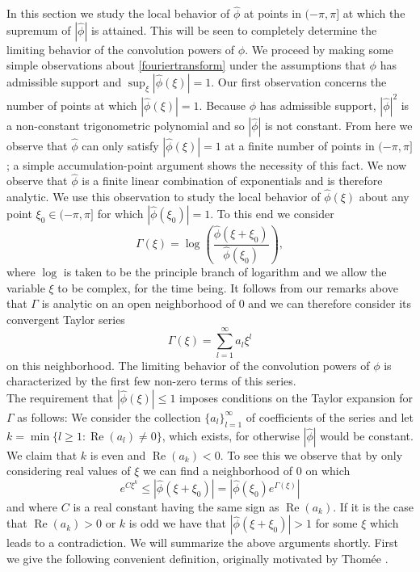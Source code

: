 \documentclass{article}
\theoremstyle{theorem}
\theoremstyle{remark}
\renewcommand\Re{\operatorname{Re}}%
\begin{document}
\noindent In this section we study the local behavior of $\hat{\phi}$ at points in $(-\pi,\pi]$
at which the supremum of $|\hat{\phi}|$ is attained. This will be seen to completely
determine the limiting behavior of the convolution powers of $\phi$. We proceed by making
some simple observations about \eqref{fouriertransform} under the assumptions
that $\phi$ has admissible support and $\sup_{\xi}|\hat{\phi}(\xi)|=1.$ Our first observation concerns the number of points at which $|\hat{\phi}(\xi)|=1.$ Because $\phi$ has admissible support, $|\hat{\phi}|^2$ is a non-constant trigonometric polynomial and so $|\hat{\phi}|$ is not constant. From here we observe that $\hat{\phi}$ can only satisfy $|\hat{\phi}(\xi)|=1$ at a finite number of points in $(-\pi,\pi]$; a simple accumulation-point argument shows the necessity of this fact. We now observe that $\hat{\phi}$ is a finite linear combination of exponentials and is
therefore analytic. We use this observation to study the local behavior of
$\hat{\phi}(\xi)$ about any point $\xi_0\in(-\pi,\pi]$ for which $|\hat{\phi}(\xi_0)|=1$. To
this end we consider 
\begin{equation}
\Gamma(\xi)=\log\left(\frac{\hat{\phi}(\xi+\xi_0)}{\hat{\phi}(\xi_0)}\right),
\end{equation}
where $\log$ is taken to be the principle branch of logarithm and we allow the
variable $\xi$ to be complex, for the time being. It follows from our 
remarks above that $\Gamma$ is analytic on an open neighborhood of $0$ and we can
therefore consider its convergent Taylor series
\begin{equation*}
 \Gamma(\xi)=\sum_{l=1}^\infty a_l \xi^l
\end{equation*} 
on this neighborhood. The limiting behavior of
the convolution powers of $\phi$ is characterized by the
first few non-zero terms of this series.\\

\noindent The requirement that $|\hat{\phi}(\xi)|\leq 1$ imposes conditions on
the Taylor expansion for $\Gamma$ as follows: We consider the collection
$\{a_l\}_{l=1}^{\infty}$ of coefficients of the series and let
$k=\min\{l\geq 1:\Re(a_l)\neq0\}$, which exists, for otherwise $|\hat{\phi}|$ would be
constant. We claim that $k$ is even and $\Re(a_k)<0$. To see this we observe that
by only considering real values of $\xi$ we can find a neighborhood of $0$ on
which
\begin{equation*}
e^{C\xi^k}\leq|\hat{\phi}(\xi+\xi_0)|=|\hat{\phi}(\xi_0)e^{\Gamma(\xi)}|
\end{equation*}
and where $C$ is a real constant having the same sign as $\Re(a_k)$. If it is
the case that $\Re(a_k)>0$ or $k$ is odd we have that $|\hat{\phi}(\xi+\xi_0)|>1$
for some $\xi$ which leads to a contradiction. We will summarize the above arguments shortly. First we give the following convenient definition, originally motivated by
Thom\'{e}e \cite{VT2}.
\end{document}
